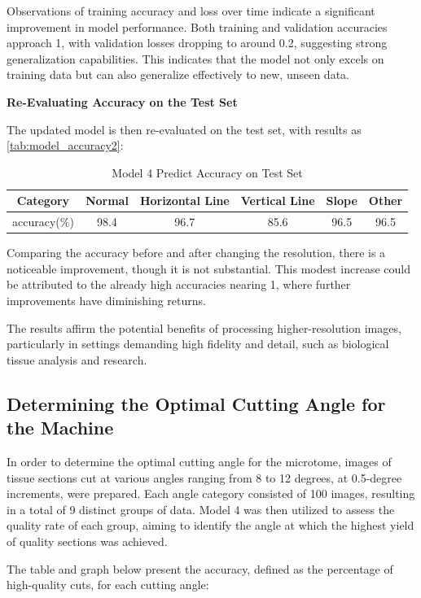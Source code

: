 Observations of training accuracy and loss over time indicate a significant improvement in model performance. Both training and validation accuracies approach 1, with validation losses dropping to around 0.2, suggesting strong generalization capabilities. This indicates that the model not only excels on training data but can also generalize effectively to new, unseen data.

\textbf{Re-Evaluating Accuracy on the Test Set}

The updated model is then re-evaluated on the test set, with results as \autoref{tab:model_accuracy2}:

\begin{table}[H]
    \centering
    \caption{Model 4 Predict Accuracy on Test Set}
    \begin{tabular}{cccccc}
        \toprule
        Category & Normal & Horizontal Line & Vertical Line & Slope & Other \\
        \midrule
        accuracy(\%) & 98.4 & 96.7 & 85.6 & 96.5 & 96.5 \\
        \bottomrule
    \end{tabular}
    \label{tab:model_accuracy2}
    \end{table}

Comparing the accuracy before and after changing the resolution, there is a noticeable improvement, though it is not substantial. This modest increase could be attributed to the already high accuracies nearing 1, where further improvements have diminishing returns.

The results affirm the potential benefits of processing higher-resolution images, particularly in settings demanding high fidelity and detail, such as biological tissue analysis and research.

\subsection{Determining the Optimal Cutting Angle for the Machine}

In order to determine the optimal cutting angle for the microtome, images of tissue sections cut at various angles ranging from 8 to 12 degrees, at 0.5-degree increments, were prepared. Each angle category consisted of 100 images, resulting in a total of 9 distinct groups of data. Model 4 was then utilized to assess the quality rate of each group, aiming to identify the angle at which the highest yield of quality sections was achieved.

The table and graph below present the accuracy, defined as the percentage of high-quality cuts, for each cutting angle:

